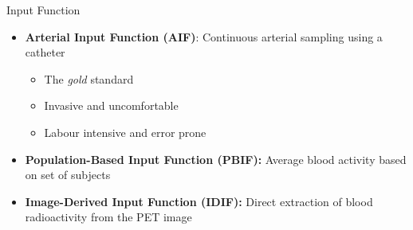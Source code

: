 \documentclass[aspectratio=169]{beamer}
\begin{document}
\begin{frame}{Input Function}
	\centering
	\begin{itemize}
		\item \textbf{Arterial Input Function (AIF)}: Continuous arterial sampling using a catheter
		      \begin{itemize}
			      \item The \textit{gold} standard
			      \item Invasive and uncomfortable
			      \item Labour intensive and error prone
		      \end{itemize}
		\item \textbf{Population-Based Input Function (PBIF):} Average blood activity based on set of subjects
		\item \textbf{Image-Derived Input Function (IDIF):}
		      Direct extraction of blood radioactivity from the PET image
	\end{itemize}


\end{frame}
\end{document}
